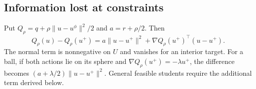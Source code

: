 \subsection{Information lost at constraints}
Put $Q_\rho=q+\rho\|u-u^\phi\|^2/2$ and $a=r+\rho/2$. Then
\begin{equation}\label{eq:v9-normal}
 Q_\rho(u)-Q_\rho(u^+)=a\|u-u^+\|^2+
              \nabla Q_\rho(u^+)^\top(u-u^+).
\end{equation}
The normal term is nonnegative on $U$ and vanishes for an interior
target. For a ball, if both actions lie on its sphere and
$\nabla Q_\rho(u^+)=-\lambda u^+$, the difference becomes
$(a+\lambda/2)\|u-u^+\|^2$. General feasible students require the
additional term derived below.

